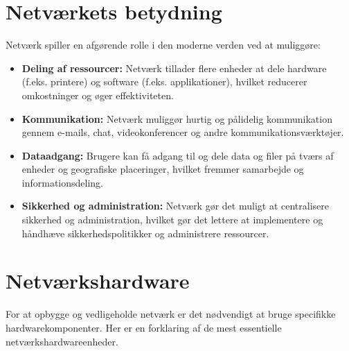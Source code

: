 \section{Netværkets betydning}
Netværk spiller en afgørende rolle i den moderne verden ved at muliggøre:
\begin{itemize}
	\item \textbf{Deling af ressourcer:} Netværk tillader flere enheder at dele hardware (f.eks. printere) og software (f.eks. applikationer), hvilket reducerer omkostninger og øger effektiviteten.
	\item \textbf{Kommunikation:} Netværk muliggør hurtig og pålidelig kommunikation gennem e-mails, chat, videokonferencer og andre kommunikationsværktøjer.
	\item \textbf{Dataadgang:} Brugere kan få adgang til og dele data og filer på tværs af enheder og geografiske placeringer, hvilket fremmer samarbejde og informationsdeling.
	\item \textbf{Sikkerhed og administration:} Netværk gør det muligt at centralisere sikkerhed og administration, hvilket gør det lettere at implementere og håndhæve sikkerhedspolitikker og administrere ressourcer.
\end{itemize}

\section{Netværkshardware}
For at opbygge og vedligeholde netværk er det nødvendigt at bruge specifikke hardwarekomponenter. Her er en forklaring af de mest essentielle netværkshardwareenheder.

